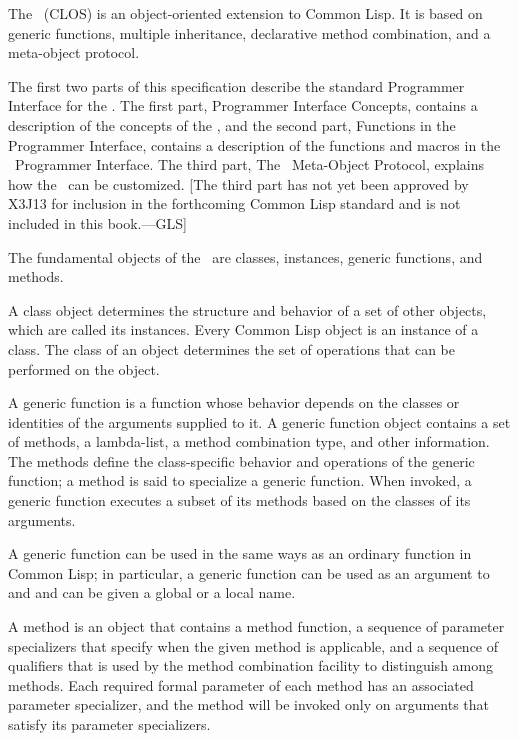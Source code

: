 The \CLOS\ (CLOS) is an object-oriented extension to Common Lisp. It is based on
generic functions, multiple inheritance, declarative method
combination, and a meta-object protocol.

The first two parts of this specification describe
the standard Programmer Interface for the \CLOS.  The first part,
Programmer Interface Concepts,
contains a description of the concepts of the \CLOS, and the second part,
Functions in the Programmer Interface,
contains a description of the functions and macros in the \CLOS\
Programmer Interface.  The third part, The \CLOS\ Meta-Object
Protocol, explains how the \CLOS\ can be customized.  [The third part
has not yet been approved by X3J13 for inclusion in the forthcoming
Common Lisp standard and is not included in this book.---GLS]

The fundamental objects of the \CLOS\ are classes, instances,
generic functions, and methods. 

A {\bit class\/} object determines the structure and behavior of a set
of other objects, which are called its {\bit instances}. 
Every Common Lisp object is an {\bit
instance\/} of a class.  The class of an object determines the set of
operations that can be performed on the object.

A {\bit generic function\/} is a function whose behavior depends on the
classes or identities of the arguments supplied to it.  A generic
function object contains a set of methods, a lambda-list, a
method combination type, and other information.  The {\bit methods} define
the class-specific behavior and operations of the generic function; a
method is said to {\bit specialize\/} a generic function.  When invoked,
a generic function executes a subset of its methods based on the
classes of its arguments.

A generic function can be used in 
the same ways as an ordinary function in Common Lisp; in
particular, a generic function can be used as an argument to 
 and  and can be given a global or a local name.

A {\bit method\/} is an object that contains a method function, a sequence of
{\bit parameter specializers\/} that specify when the given method is
applicable, and a sequence of {\bit qualifiers\/} that is used by the
{\bit method combination\/} facility to distinguish among methods.  Each
required formal parameter of each method has an associated parameter
specializer, and the method will be invoked only on arguments that
satisfy its parameter specializers.

